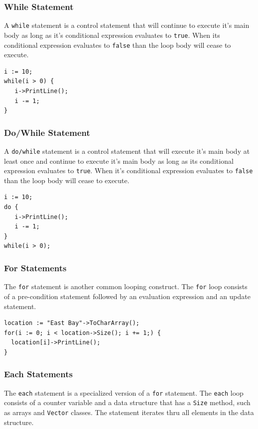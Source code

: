 \documentclass[11pt]{article}
\begin{document}
\subsubsection{While Statement}

A \texttt{while} statement is a control statement that will continue
to execute it's main body as long as it's conditional expression
evaluates to \texttt{true}.  When its conditional expression evaluates
to \texttt{false} than the loop body will cease to execute.

\begin{verbatim}
i := 10;
while(i > 0) {
   i->PrintLine();
   i -= 1;
}
\end{verbatim}

\subsubsection{Do/While Statement}

A \texttt{do/while} statement is a control statement that will execute
it's main body at least once and continue to execute it's main body as
long as its conditional expression evaluates to \texttt{true}.  When
it's conditional expression evaluates to \texttt{false} than the loop
body will cease to execute.

\begin{verbatim}
i := 10;
do { 
   i->PrintLine();
   i -= 1;
} 
while(i > 0);
\end{verbatim}

\subsubsection{For Statements}

The \texttt{for} statement is another common looping construct.  The
\texttt{for} loop consists of a pre-condition statement followed by an
evaluation expression and an update statement.

\begin{verbatim}
location := "East Bay"->ToCharArray();
for(i := 0; i < location->Size(); i += 1;) {
  location[i]->PrintLine();
}
\end{verbatim}

\subsubsection{Each Statements}

The \texttt{each} statement is a specialized version of a \texttt{for}
statement.  The \texttt{each} loop consists of a counter variable and
a data structure that has a \texttt{Size} method, such as arrays and
\texttt{Vector} classes.  The statement iterates thru all elements in
the data structure.
\end{document}
